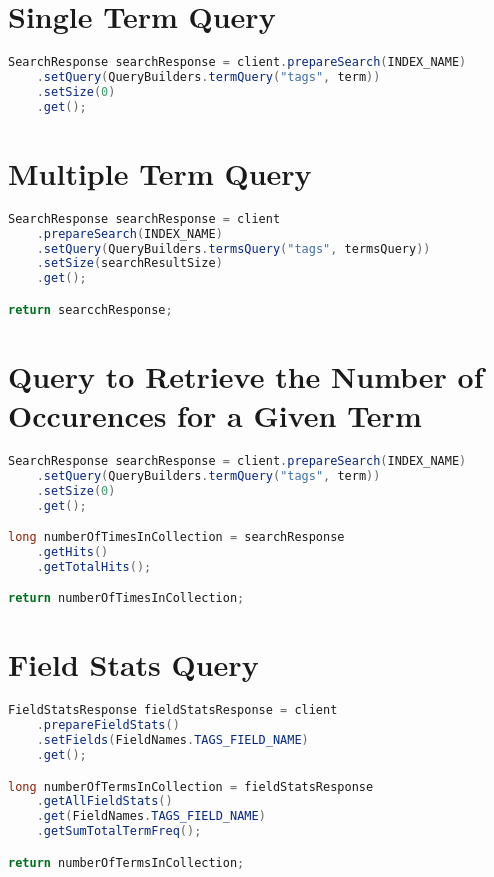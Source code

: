 \section{Single Term Query}
\begin{lstlisting}[language={java}, caption={Java code used to search for a single term.}, label={ap:single-term-query}]
  SearchResponse searchResponse = client.prepareSearch(INDEX_NAME)
    .setQuery(QueryBuilders.termQuery("tags", term))
    .setSize(0)
    .get();
\end{lstlisting}

\section{Multiple Term Query}
\begin{lstlisting}[language={java}, caption={Java code used to search for multiple terms.}, label={ap:multiple-term-query}]
SearchResponse searchResponse = client
    .prepareSearch(INDEX_NAME)
    .setQuery(QueryBuilders.termsQuery("tags", termsQuery))
    .setSize(searchResultSize)
    .get();

return searcchResponse;
\end{lstlisting}

\section{Query to Retrieve the Number of Occurences for a Given Term}
\begin{lstlisting}[language={java}, caption={Java code used retrieve the number of occurences for a given term in the collection.}, label={ap:number-of-occurences-query}]
SearchResponse searchResponse = client.prepareSearch(INDEX_NAME)
    .setQuery(QueryBuilders.termQuery("tags", term))
    .setSize(0)
    .get();

long numberOfTimesInCollection = searchResponse
    .getHits()
    .getTotalHits();

return numberOfTimesInCollection;
\end{lstlisting}

\section{Field Stats Query}
\begin{lstlisting}[language={java}, caption={Java code used retrieve the total number of terms in a field in the collection.}, label={ap:field-stasts-query}]
FieldStatsResponse fieldStatsResponse = client
    .prepareFieldStats()
    .setFields(FieldNames.TAGS_FIELD_NAME)
    .get();

long numberOfTermsInCollection = fieldStatsResponse
    .getAllFieldStats()
    .get(FieldNames.TAGS_FIELD_NAME)
    .getSumTotalTermFreq();

return numberOfTermsInCollection;
\end{lstlisting}

